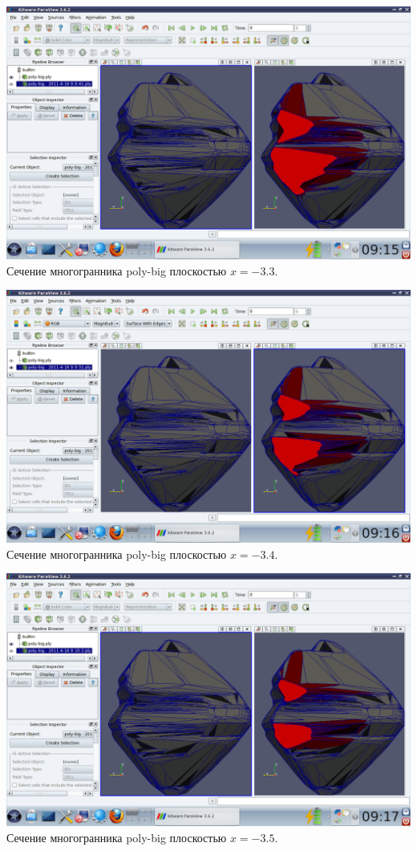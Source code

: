 \documentclass[a4paper,12pt, titlepage]{article}
\begin{document}
	\begin{flushleft}
		\includegraphics[trim = 220 65 10 140, clip, width=15cm]{poly-big/33.png}
		Сечение многогранника poly-big плоскостью $x = -3.3$.
	\end{flushleft}
	\begin{flushleft}
		\includegraphics[trim = 220 65 10 140, clip, width=15cm]{poly-big/34.png}
		Сечение многогранника poly-big плоскостью $x = -3.4$.
	\end{flushleft}
	\begin{flushleft}
		\includegraphics[trim = 220 65 10 140, clip, width=15cm]{poly-big/35.png}
		Сечение многогранника poly-big плоскостью $x = -3.5$.
	\end{flushleft}
\end{document}
